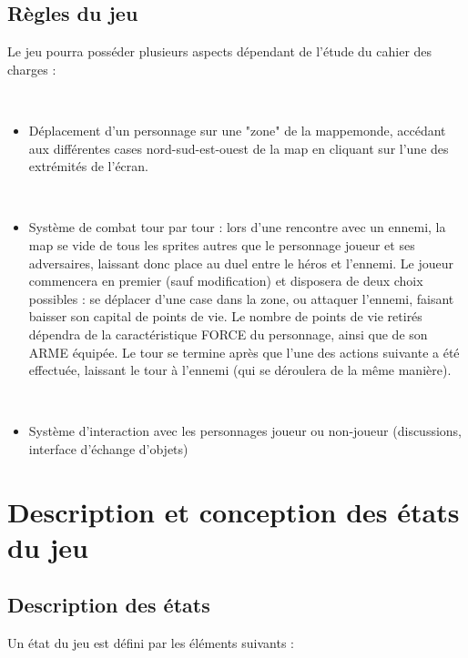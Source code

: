 \documentclass[12pt,a4paper]{report}
\begin{document}
    \section{Règles du jeu}
    Le jeu pourra posséder plusieurs aspects dépendant de l'étude du cahier des charges :
    \par\leavevmode\
\begin{itemize}
\item Déplacement d'un personnage sur une "zone" de la mappemonde, accédant aux différentes cases nord-sud-est-ouest de la map en cliquant sur l'une des extrémités de l'écran.
\par\leavevmode\

\item Système de combat tour par tour : lors d'une rencontre avec un ennemi, la map se vide de tous les sprites autres que le personnage joueur et ses adversaires, laissant donc place au duel entre le héros et l'ennemi. Le joueur commencera en premier (sauf modification) et disposera de deux choix possibles : se déplacer d'une case dans la zone, ou attaquer l'ennemi, faisant baisser son capital de points de vie. Le nombre de points de vie retirés dépendra de la caractéristique FORCE du personnage, ainsi que de son ARME équipée. Le tour se termine après que l'une des actions suivante a été effectuée, laissant le tour à l'ennemi (qui se déroulera de la même manière).






\par\leavevmode\

\item Système d'interaction avec les personnages joueur ou non-joueur (discussions, interface d'échange d'objets)
\end{itemize}

    \chapter{Description et conception des états du jeu}
    
    \section{Description des états}
    Un état du jeu est défini par les éléments suivants :
    
\end{document}
